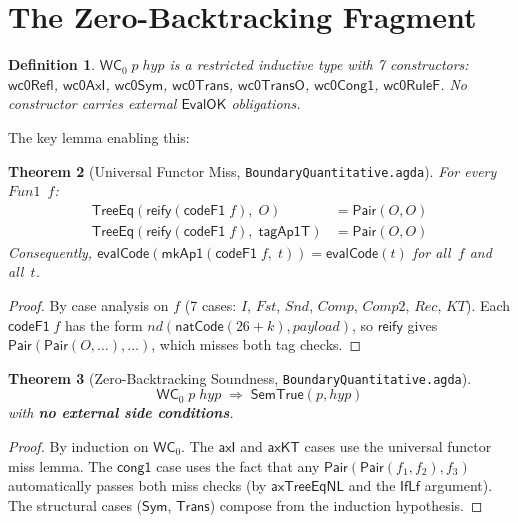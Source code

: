 \documentclass[11pt]{article}
\newtheorem{theorem}{Theorem}
\newtheorem{definition}[theorem]{Definition}
\newcommand{\WCz}{\mathsf{WC}_0}
\newcommand{\SemTrue}{\mathsf{SemTrue}}
\newcommand{\EvalOK}{\mathsf{EvalOK}}
\newcommand{\evalCode}{\mathsf{evalCode}}
\newcommand{\reify}{\mathsf{reify}}
\newcommand{\Pair}{\mathsf{Pair}}
\newcommand{\TreeEq}{\mathsf{TreeEq}}
\begin{document}
\section{The Zero-Backtracking Fragment}

\begin{definition}
$\WCz\;p\;\mathit{hyp}$ is a restricted inductive type with 7 constructors:
$\mathsf{wc0Refl}$, $\mathsf{wc0AxI}$, $\mathsf{wc0Sym}$,
$\mathsf{wc0Trans}$, $\mathsf{wc0TransO}$, $\mathsf{wc0Cong1}$,
$\mathsf{wc0RuleF}$.
No constructor carries external $\EvalOK$ obligations.
\end{definition}

The key lemma enabling this:

\begin{theorem}[Universal Functor Miss, \texttt{BoundaryQuantitative.agda}]
For every $\mathit{Fun1}$~$f$:
\begin{align*}
\TreeEq(\reify(\mathsf{codeF1}\;f),\; O) &= \Pair(O,O) \\
\TreeEq(\reify(\mathsf{codeF1}\;f),\; \mathsf{tagAp1T}) &= \Pair(O,O)
\end{align*}
Consequently, $\evalCode(\mathsf{mkAp1}(\mathsf{codeF1}\;f,\; t)) = \evalCode(t)$
for all~$f$ and all~$t$.
\end{theorem}

\begin{proof}
By case analysis on $f$ (7 cases: $I$, $\mathit{Fst}$, $\mathit{Snd}$,
$\mathit{Comp}$, $\mathit{Comp2}$, $\mathit{Rec}$, $\mathit{KT}$).
Each $\mathsf{codeF1}\;f$ has the form $\mathit{nd}(\mathsf{natCode}(26{+}k), \mathit{payload})$,
so $\reify$ gives $\Pair(\Pair(O, \ldots), \ldots)$, which misses both tag checks.
\end{proof}

\begin{theorem}[Zero-Backtracking Soundness, \texttt{BoundaryQuantitative.agda}]
\[
  \WCz\;p\;\mathit{hyp} \;\Rightarrow\; \SemTrue(p, \mathit{hyp})
\]
with \textbf{no external side conditions}.
\end{theorem}

\begin{proof}
By induction on $\WCz$. The $\mathsf{axI}$ and $\mathsf{axKT}$ cases use
the universal functor miss lemma. The $\mathsf{cong1}$ case uses
the fact that any $\Pair(\Pair(f_1,f_2),f_3)$ automatically passes
both miss checks (by $\mathsf{axTreeEqNL}$ and the $\mathsf{IfLf}$ argument).
The structural cases ($\mathsf{Sym}$, $\mathsf{Trans}$) compose from the
induction hypothesis.
\end{proof}
\end{document}
